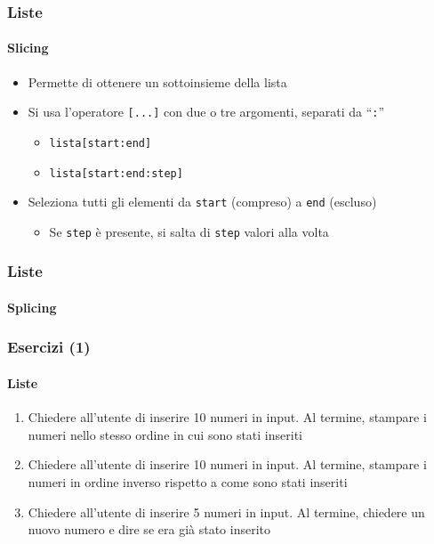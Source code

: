\begin{contentframe}
    \frametitle{Liste}
    \framesubtitle{Slicing}

    \begin{itemize}
        \item Permette di ottenere un sottoinsieme della lista
    
        \bigskip
        \item Si usa l'operatore \texttt{[...]} con due o tre argomenti, separati da ``\texttt{:}''
        \begin{itemize}
            \item \texttt{lista[start:end]}
            \item \texttt{lista[start:end:step]}
        \end{itemize}
        
        \item Seleziona tutti gli elementi da \texttt{start} (compreso) a \texttt{end} (escluso)
        \begin{itemize}
            \item Se \texttt{step} è presente, si salta di \texttt{step} valori alla volta
        \end{itemize}
    \end{itemize}
\end{contentframe}

\begin{contentframe}
    \frametitle{Liste}
    \framesubtitle{Splicing}

\end{contentframe}

\begin{exerciseframe}
    \frametitle{Esercizi (1)}
    \framesubtitle{Liste}

    \begin{enumerate}
        \item Chiedere all'utente di inserire 10 numeri in input. Al termine, stampare i numeri nello stesso ordine in cui sono stati inseriti

        \pause
        \bigskip
        \item Chiedere all'utente di inserire 10 numeri in input. Al termine, stampare i numeri in ordine inverso rispetto a come sono stati inseriti

        \pause
        \bigskip
        \item Chiedere all'utente di inserire 5 numeri in input. Al termine, chiedere un nuovo numero e dire se era già stato inserito
    \end{enumerate}
\end{exerciseframe}

